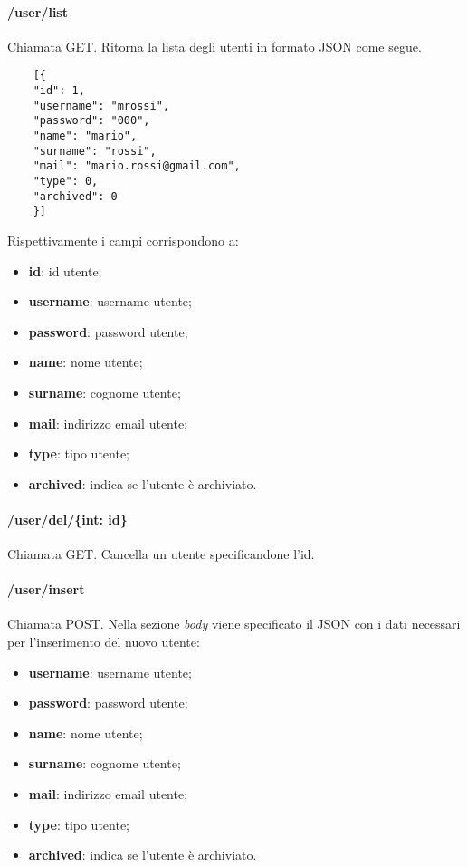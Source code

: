\paragraph{/user/list}
Chiamata GET. Ritorna la lista degli utenti in formato JSON come segue.	\\
\begin{center}
	\begin{lstlisting}
	[{
	"id": 1,
	"username": "mrossi",
	"password": "000",
	"name": "mario",
	"surname": "rossi",
	"mail": "mario.rossi@gmail.com",
	"type": 0,
	"archived": 0
	}]
	\end{lstlisting}
\end{center}
Rispettivamente i campi corrispondono a:
\begin{itemize}
	\item \textbf{id}: id utente;
	\item \textbf{username}: username utente;
	\item \textbf{password}: password utente;
	\item \textbf{name}: nome utente;
	\item \textbf{surname}: cognome utente;	
	\item \textbf{mail}: indirizzo email utente;	
	\item \textbf{type}: tipo utente;	
	\item \textbf{archived}: indica se l'utente è archiviato.	
\end{itemize}
\paragraph{/user/del/\{int: id\}}
Chiamata GET. Cancella un utente specificandone l'id.
\paragraph{/user/insert}
Chiamata POST. Nella sezione \textit{body} viene specificato il JSON con i dati necessari per l'inserimento del nuovo utente:
\begin{itemize}
	\item \textbf{username}: username utente;
	\item \textbf{password}: password utente;
	\item \textbf{name}: nome utente;
	\item \textbf{surname}: cognome utente;	
	\item \textbf{mail}: indirizzo email utente;	
	\item \textbf{type}: tipo utente;	
	\item \textbf{archived}: indica se l'utente è archiviato.	
\end{itemize}

